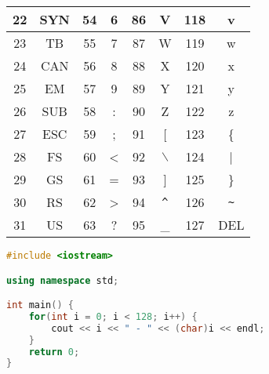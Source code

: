\begin{longtable}{|c|c|c|c|c|c|c|c|}
	\hline
	22             & SYN           & 54             & 6             & 86             & V                      & 118            & v                      \\
	\hline
	23             & TB            & 55             & 7             & 87             & W                      & 119            & w                      \\
	\hline
	24             & CAN           & 56             & 8             & 88             & X                      & 120            & x                      \\
	\hline
	25             & EM            & 57             & 9             & 89             & Y                      & 121            & y                      \\
	\hline
	26             & SUB           & 58             & :             & 90             & Z                      & 122            & z                      \\
	\hline
	27             & ESC           & 59             & ;             & 91             & [                      & 123            & \{                     \\
			\hline
	28             & FS            & 60             & <             & 92             & $ \backslash $         & 124            & |                      \\
			\hline
	29             & GS            & 61             & =             & 93             & ]                      & 125            & \}                     \\
	\hline
	30             & RS            & 62             & >             & 94             & \lstinline|^| & 126            & \lstinline|~| \\
	\hline
	31             & US            & 63             & ?             & 95             & \_                     & 127            & DEL                    \\
	\hline
\end{longtable}

\vspace{0.5cm}


\begin{lstlisting}[language=C++]
#include <iostream>

using namespace std;

int main() {
	for(int i = 0; i < 128; i++) {
		cout << i << " - " << (char)i << endl;
	}
	return 0;
}
\end{lstlisting}

